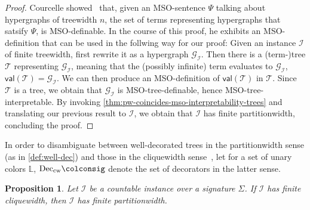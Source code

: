 \documentclass[10pt,a4paper]{amsart}
\theoremstyle{definition}
\numberwithin{equation}{section}
\theoremstyle{plain}
\newtheorem{proposition}[proposition]{Proposition}
\theoremstyle{definition}
\theoremstyle{myexample}
\theoremstyle{plain}
\theoremstyle{definition}
\newcommand{\instance}{\mathcal{I}}
\newcommand{\inst}{\instance}
\newcommand{\cols}{\mathbb{L}}
\newcommand{\ercwidth}{\partitionwidth}
\newcommand{\partitionwidth}{par\-ti\-tion\-width}
\newcommand{\fcn}[1]{\mathsf{#1}}
\begin{document}
\begin{proof}
	Courcelle showed~\cite[Theorem 8.1]{Cou89} that, given an MSO-sentence $\Psi$ talking about hypergraphs of treewidth $n$, the set of terms representing hypergraphs that satsify $\Psi$, is MSO-definable. In the course of this proof, he exhibits an MSO-definition that can be used in the follwing way for our proof: Given an instance $\inst$ of finite treewidth, first rewrite it as a hypergraph $\mathcal{G}_{\inst}$. Then there is a (term-)tree $\mathcal{T}$ representing $\mathcal{G}_{\inst}$, meaning that the (possibly infinite) term evaluates to $\mathcal{G}_{\inst}$, $\fcn{val}(\mathcal{T}) = \mathcal{G}_{\inst}$. We can then produce an MSO-definition of $\fcn{val}(\mathcal{T}) $ in $\mathcal{T}$. Since $\mathcal{T}$ is a tree, we obtain that $\mathcal{G}_{\inst}$ is MSO-tree-definable, hence MSO-tree-interpretable. By invoking \cref{thm:pw-coincides-mso-interpretability-trees} and translating our previous result to $\inst$, we obtain that $\inst$ has finite \partitionwidth{}, concluding the proof.
\end{proof}

In order to disambiguate between well-decorated trees in the \partitionwidth{} sense (as in \cref{def:well-dec}) and those in the cliquewidth sense~\cite[Definition 6]{ICDT2023}, let for a set of unary colors $\cols$, $\mathrm{Dec}_{\mathrm{cw}}\colconsig$ denote the set of decorators in the latter sense.

\begin{proposition}\label{prop:cw-implies-pw}
	Let $\inst$ be a countable instance over a signature $\Sigma$.
	If $\inst$ has finite cliquewidth, then $\inst$ has finite \ercwidth{}.
\end{proposition}
\end{document}
